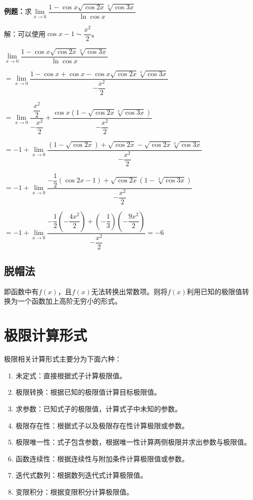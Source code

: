 \documentclass[UTF8, 12pt]{ctexart}
\begin{document}
\textbf{例题：}求$\lim\limits_{x\to 0}\dfrac{1-\cos x\sqrt{\cos 2x}\sqrt[3]{\cos 3x}}{\ln\cos x}$\medskip

解：可以使用$\cos x-1\sim\dfrac{x^2}{2}$。\medskip

$\lim\limits_{x\to 0}\dfrac{1-\cos x\sqrt{\cos 2x}\sqrt[3]{\cos 3x}}{\ln\cos x}$

$=\lim\limits_{x\to 0}\dfrac{1-\cos x+\cos x-\cos x\sqrt{\cos 2x}\sqrt[3]{\cos 3x}}{-\dfrac{x^2}{2}}$

$=\lim\limits_{x\to 0}\dfrac{\dfrac{x^2}{2}}{-\dfrac{x^2}{2}}+\dfrac{\cos x(1-\sqrt{\cos 2x}\sqrt[3]{\cos 3x})}{-\dfrac{x^2}{2}}$

$=-1+\lim\limits_{x\to 0}\dfrac{(1-\sqrt{\cos 2x})+\sqrt{\cos 2x}-\sqrt{\cos 2x}\sqrt[3]{\cos 3x}}{-\dfrac{x^2}{2}}$

$=-1+\lim\limits_{x\to 0}\dfrac{-\dfrac{1}{2}(\cos 2x-1)+\sqrt{\cos 2x}(1-\sqrt[3]{\cos 3x})}{-\dfrac{x^2}{2}}$

$=-1+\lim\limits_{x\to 0}\dfrac{-\dfrac{1}{2}(-\dfrac{4x^2}{2})+\left(-\dfrac{1}{3}\right)\left(-\dfrac{9x^2}{2}\right)}{-\dfrac{x^2}{2}}=-6$

\subsection{脱帽法}

即函数中有$f(x)$，且$f(x)$无法转换出常数项。则将$f(x)$利用已知的极限值转换为一个函数加上高阶无穷小的形式。

\section{极限计算形式}

极限相关计算形式主要分为下面六种：

\begin{enumerate}
    \item 未定式：直接根据式子计算极限值。
    \item 极限转换：根据已知的极限值计算目标极限值。
    \item 求参数：已知式子的极限值，计算式子中未知的参数。
    \item 极限存在性：根据式子以及极限存在性计算极限或参数。
    \item 极限唯一性：式子包含参数，根据唯一性计算两侧极限并求出参数与极限值。
    \item 函数连续性：根据连续性与附加条件计算极限值或参数。
    \item 迭代式数列：根据数列迭代式计算极限值。
    \item 变限积分：根据变限积分计算极限值。
\end{enumerate}
\end{document}
